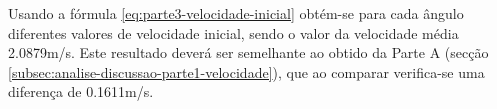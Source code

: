 {Usando a fórmula \ref{eq:parte3-velocidade-inicial} obtém-se para cada ângulo diferentes valores de velocidade inicial, sendo o valor da velocidade média 2.0879m/s. Este resultado deverá ser semelhante ao obtido da Parte A (secção \ref{subsec:analise-discussao-parte1-velocidade}), que ao comparar verifica-se uma diferença de 0.1611m/s.

}
